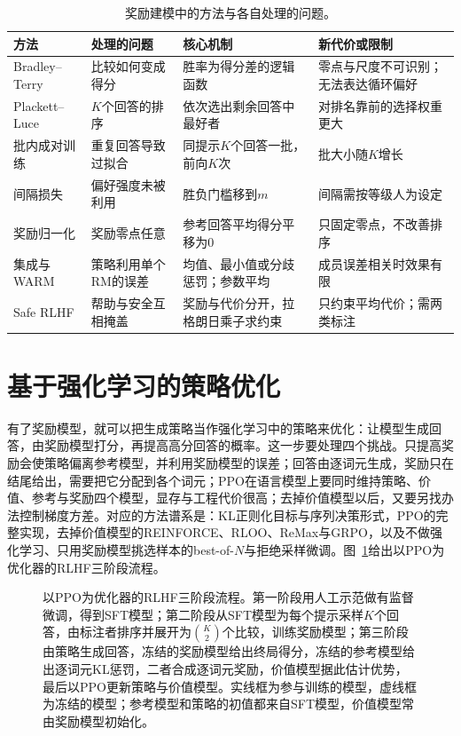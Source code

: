 \begin{table}[htbp]
  \centering
  \small
  \caption{奖励建模中的方法与各自处理的问题。}
  \label{tab:nlp-align-reward-methods}
  \begin{tabularx}{\linewidth}{@{}p{26mm}p{32mm}p{48mm}X@{}}
    \toprule
    方法 & 处理的问题 & 核心机制 & 新代价或限制\\
    \midrule
    Bradley--Terry & 比较如何变成得分 & 胜率为得分差的逻辑函数 & 零点与尺度不可识别；无法表达循环偏好\\
    Plackett--Luce & $K$个回答的排序 & 依次选出剩余回答中最好者 & 对排名靠前的选择权重更大\\
    批内成对训练 & 重复回答导致过拟合 & 同提示$K$个回答一批，前向$K$次 & 批大小随$K$增长\\
    间隔损失 & 偏好强度未被利用 & 胜负门槛移到$m$ & 间隔需按等级人为设定\\
    奖励归一化 & 奖励零点任意 & 参考回答平均得分平移为0 & 只固定零点，不改善排序\\
    集成与WARM & 策略利用单个RM的误差 & 均值、最小值或分歧惩罚；参数平均 & 成员误差相关时效果有限\\
    Safe RLHF & 帮助与安全互相掩盖 & 奖励与代价分开，拉格朗日乘子求约束 & 只约束平均代价；需两类标注\\
    \bottomrule
  \end{tabularx}
\end{table}

\section{基于强化学习的策略优化}
\label{sec:nlp-align-learning}

有了奖励模型，就可以把生成策略当作强化学习中的策略来优化：让模型生成回答，由奖励模型打分，再提高高分回答的概率。这一步要处理四个挑战。只提高奖励会使策略偏离参考模型，并利用奖励模型的误差；回答由逐词元生成，奖励只在结尾给出，需要把它分配到各个词元；PPO在语言模型上要同时维持策略、价值、参考与奖励四个模型，显存与工程代价很高；去掉价值模型以后，又要另找办法控制梯度方差。对应的方法谱系是：KL正则化目标与序列决策形式，PPO的完整实现，去掉价值模型的REINFORCE、RLOO、ReMax与GRPO，以及不做强化学习、只用奖励模型挑选样本的best-of-$N$与拒绝采样微调。图~\ref{fig:nlp-align-rlhf-pipeline}给出以PPO为优化器的RLHF三阶段流程。

\begin{figure}[!t]
  \centering
  
  \caption{以PPO为优化器的RLHF三阶段流程。第一阶段用人工示范做有监督微调，得到SFT模型；第二阶段从SFT模型为每个提示采样$K$个回答，由标注者排序并展开为$\binom K2$个比较，训练奖励模型；第三阶段由策略生成回答，冻结的奖励模型给出终局得分，冻结的参考模型给出逐词元KL惩罚，二者合成逐词元奖励，价值模型据此估计优势，最后以PPO更新策略与价值模型。实线框为参与训练的模型，虚线框为冻结的模型；参考模型和策略的初值都来自SFT模型，价值模型常由奖励模型初始化。}
  \label{fig:nlp-align-rlhf-pipeline}
\end{figure}

